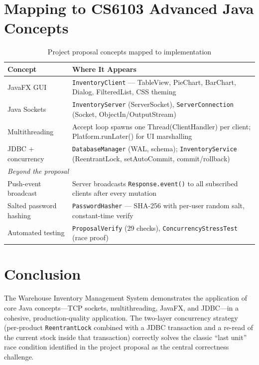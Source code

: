 \documentclass[12pt,a4paper]{article}
\begin{document}
\section{Mapping to CS6103 Advanced Java Concepts}

\begin{table}[H]
\centering
\begin{tabularx}{\linewidth}{lX}
\toprule
\textbf{Concept} & \textbf{Where It Appears} \\
\midrule
JavaFX GUI              & \texttt{InventoryClient} --- TableView, PieChart, BarChart, Dialog, FilteredList, CSS theming \\
Java Sockets            & \texttt{InventoryServer} (ServerSocket), \texttt{ServerConnection} (Socket, ObjectIn/OutputStream) \\
Multithreading          & Accept loop spawns one Thread(ClientHandler) per client; Platform.runLater() for UI marshalling \\
JDBC + concurrency      & \texttt{DatabaseManager} (WAL, schema); \texttt{InventoryService} (ReentrantLock, setAutoCommit, commit/rollback) \\
\midrule
\multicolumn{2}{l}{\textit{Beyond the proposal}} \\
\midrule
Push-event broadcast    & Server broadcasts \texttt{Response.event()} to all subscribed clients after every mutation \\
Salted password hashing & \texttt{PasswordHasher} --- SHA-256 with per-user random salt, constant-time verify \\
Automated testing       & \texttt{ProposalVerify} (29 checks), \texttt{ConcurrencyStressTest} (race proof) \\
\bottomrule
\end{tabularx}
\caption{Project proposal concepts mapped to implementation}
\end{table}

\section{Conclusion}

The Warehouse Inventory Management System demonstrates the application of core Java
concepts---TCP sockets, multithreading, JavaFX, and JDBC---in a cohesive,
production-quality application. The two-layer concurrency strategy (per-product
\texttt{ReentrantLock} combined with a JDBC transaction and a re-read of the
current stock inside that transaction) correctly solves the classic ``last unit''
race condition identified in the project proposal as the central correctness
challenge.
\end{document}
